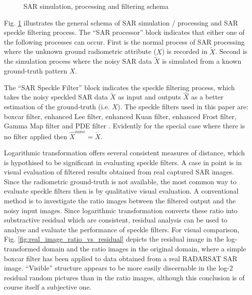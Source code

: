 \documentclass[journal]{IEEEtran}
\begin{document}
\begin{figure}[h]
 \centering
 \epsfxsize=2.4in
 \epsfysize=1.2in
\caption{SAR simulation, processing and filtering schema}
\label{fig:simul_process_filter_schema}
\end{figure}

Fig. \ref{fig:simul_process_filter_schema} illustrates the general schema of SAR simulation / processing and 
SAR speckle filtering process.
The ``SAR processor'' block indicates that either one of the following processes can occur.
First is the normal process of SAR processing where the unknown ground radiometric attribute ($X$) is recorded 
in $\tilde{X}$. Second is the simulation process where the noisy SAR data $\tilde{X}$ is simulated from a known 
ground-truth pattern $X$.

The ``SAR Speckle Filter'' block indicates the speckle filtering process, 
	which takes the noisy speckled SAR data $\tilde{X}$ as input
	and outputs $\hat{X}$ as a better estimation of the ground-truth (i.e. $X$).
The speckle filters used in this paper are: 
	boxcar filter, enhanced Lee filter, enhanced Kuan filter, enhanced Frost filter, Gamma Map filter 
	and PDE filter \cite{You_TIP_2000}.
Evidently for the special case where there is no filter applied then $\hat{X}^{none} = \tilde{X}$.

Logarithmic transformation offers several consistent measures of distance, which is hypothised to be 
significant in evaluating speckle filters.
	A case in point is in visual evaluation of filtered results obtained from real captured SAR images.
Since the radiometric ground-truth is not available, %
	the most common way to evaluate speckle filters then is by qualitative visual evaluation.
A conventional method is to investigate the ratio images between the filtered output and the noisy input images.
Since logarithmic transformation converts these ratio into substractive residual which are consistent, residual 
analysis can be used to analyse and evaluate the performance of speckle filters.
For visual comparison, Fig. \ref{fig:real_image_ratio_vs_residual} depicts the residual image in the log-transformed domain 
and the ratio images in the original domain, where a simple boxcar filter has been applied to data obtained from a 
real RADARSAT SAR image.
``Visible'' structure appears to be more easily discernable in the log-2 residual random pictures than in 
the ratio images, although this conclusion is of course itself a subjective one.
\end{document}
